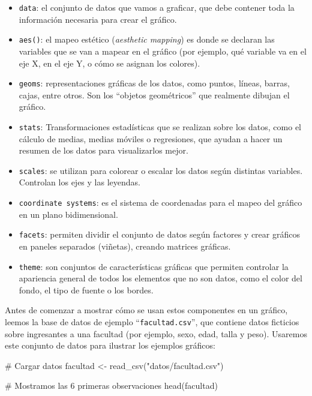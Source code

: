 \documentclass[
  spanish,
  letterpaper,
  DIV=11,
  numbers=noendperiod]{scrreprt}
\newenvironment{Shaded}{\begin{snugshade}}{\end{snugshade}}
\newcommand{\CommentTok}[1]{\textcolor[rgb]{0.37,0.37,0.37}{#1}}
\newcommand{\FunctionTok}[1]{\textcolor[rgb]{0.28,0.35,0.67}{#1}}
\newcommand{\NormalTok}[1]{\textcolor[rgb]{0.00,0.23,0.31}{#1}}
\newcommand{\OtherTok}[1]{\textcolor[rgb]{0.00,0.23,0.31}{#1}}
\newcommand{\StringTok}[1]{\textcolor[rgb]{0.13,0.47,0.30}{#1}}
\providecommand{\tightlist}{%
  \setlength{\itemsep}{0pt}\setlength{\parskip}{0pt}}
\begin{document}
\begin{itemize}
\tightlist
\item
  \texttt{data}: el conjunto de datos que vamos a graficar, que debe
  contener toda la información necesaria para crear el gráfico.
\item
  \texttt{aes()}: el mapeo estético (\emph{aesthetic mapping}) es donde
  se declaran las variables que se van a mapear en el gráfico (por
  ejemplo, qué variable va en el eje X, en el eje Y, o cómo se asignan
  los colores).
\item
  \texttt{geoms}: representaciones gráficas de los datos, como puntos,
  líneas, barras, cajas, entre otros. Son los ``objetos geométricos''
  que realmente dibujan el gráfico.
\item
  \texttt{stats}: Transformaciones estadísticas que se realizan sobre
  los datos, como el cálculo de medias, medias móviles o regresiones,
  que ayudan a hacer un resumen de los datos para visualizarlos mejor.
\item
  \texttt{scales}: se utilizan para colorear o escalar los datos según
  distintas variables. Controlan los ejes y las leyendas.
\item
  \texttt{coordinate\ systems}: es el sistema de coordenadas para el
  mapeo del gráfico en un plano bidimensional.
\item
  \texttt{facets}: permiten dividir el conjunto de datos según factores
  y crear gráficos en paneles separados (viñetas), creando matrices
  gráficas.
\item
  \texttt{theme}: son conjuntos de características gráficas que permiten
  controlar la apariencia general de todos los elementos que no son
  datos, como el color del fondo, el tipo de fuente o los bordes.
\end{itemize}

Antes de comenzar a mostrar cómo se usan estos componentes en un
gráfico, leemos la base de datos de ejemplo ``\texttt{facultad.csv}'',
que contiene datos ficticios sobre ingresantes a una facultad (por
ejemplo, sexo, edad, talla y peso). Usaremos este conjunto de datos para
ilustrar los ejemplos gráficos:

\begin{Shaded}
\begin{Highlighting}[]
\CommentTok{\# Cargar datos}
\NormalTok{facultad }\OtherTok{\textless{}{-}} \FunctionTok{read\_csv}\NormalTok{(}\StringTok{"datos/facultad.csv"}\NormalTok{)}

\CommentTok{\# Mostramos las 6 primeras observaciones}
\FunctionTok{head}\NormalTok{(facultad)}
\end{Highlighting}
\end{Shaded}
\end{document}
